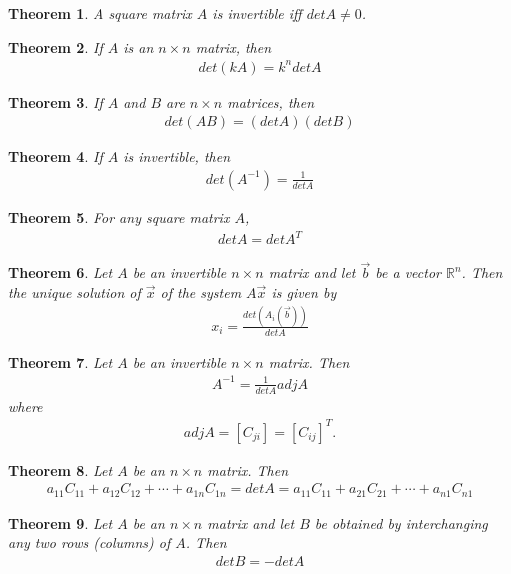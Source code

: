 \documentclass{article}
\theoremstyle{sltheorem}
\newtheorem{theorem}{Theorem}[section]
\begin{document}
\begin{theorem}
    A square matrix $A$ is invertible iff $det A \not= 0$.
\end{theorem}
\begin{theorem}
    If $A$ is an $n\times n$ matrix, then
    \begin{align*}
        det(kA) = k^n det A
    \end{align*}
\end{theorem}
\begin{theorem}
    If $A$ and $B$ are $n\times n$ matrices, then
    \begin{align*}
        det(AB) = (det A)(det B)
    \end{align*}
\end{theorem}
\begin{theorem}
    If $A$ is invertible, then
    \begin{align*}
        det(A^{-1})=\frac{1}{det A}
    \end{align*}
\end{theorem}
\begin{theorem}
    For any square matrix $A$,
    \begin{align*}
        det A = det A^T
    \end{align*}
\end{theorem}
\begin{theorem}
    Let $A$ be an invertible $n\times n$ matrix and let $\vec b$ be a vector $\mathbb{R}^n$. Then the unique solution of $\vec x$ of the system $A\vec x$ is given by
    \begin{align*}
        x_i = \frac{det(A_i(\vec b))}{det A}
    \end{align*}
\end{theorem}
\begin{theorem}
    Let $A$ be an invertible $n\times n$ matrix. Then
    \begin{align*}
        A^{-1}=\frac{1}{det A}adj A
    \end{align*}
    where
    \begin{align*}
        adj A = [C_{ji}] = [C_{ij}]^T.
    \end{align*}
\end{theorem}
\begin{theorem}
    Let $A$ be an $n\times n$ matrix. Then
    \begin{align*}
        a_{11}C_{11}+a_{12}C_{12}+\cdots+a_{1n}C_{1n}= det A = a_{11}C_{11}+a_{21}C_{21} + \cdots + a_{n1}C_{n1}
    \end{align*}
\end{theorem}
\begin{theorem}
    Let $A$ be an $n\times n$ matrix and let $B$ be obtained by interchanging any two rows (columns) of $A$. Then
    \begin{align*}
        det B = - det A
    \end{align*}
\end{theorem}
\end{document}
